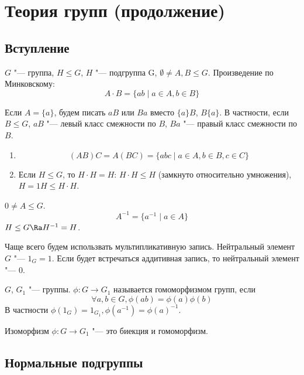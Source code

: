 ﻿\chapter{Теория групп (продолжение)}

\section{Вступление}

\begin{Def}
	$G$ "--- группа, $H \le G$, $H$ "--- подгруппа G, $\emptyset \ne A, B \le G$.
	Произведение по Минковскому:
	\[ A \cdot B = \{ab \mid a \in A, b \in B\} \]

	Если $A = \{a\}$, будем писать $aB$ или $Ba$ вместо $\{a\}B$, $B\{a\}$.
	В частности, если $B \le G$,
	$aB$ "--- левый класс смежности по $B$,
	$Ba$ "--- правый класс смежности по $B$.
\end{Def}

\begin{conseq}\hfill
	\begin{enumerate}
	\item
		\[ (AB)C = A(BC) = \{abc \mid a \in A, b \in B, c \in C\} \]

	\item
		Если $H \le G$, то $H \cdot H = H$:
		$H \cdot H \le H$ (замкнуто относительно умножения), $H = 1H \le H \cdot H$.
	\end{enumerate}
\end{conseq}

\begin{Def}
	$0 \ne A \le G$.
	\[ A^{-1} = \{a^{-1} \mid a \in A\} \]
	$H \le G \Ra H^{-1} = H$.
\end{Def}

\begin{Rem}
	Чаще всего будем использвать мультипликативную запись.
	Нейтральный элемент $G$ "--- $1_{G} = 1$.
	Если будет встречаться аддитивная запись, то нейтральный элемент "--- $0$.
\end{Rem}

\begin{Def}
	$G$, $G_1$ "--- группы.
	$\phi \colon G \to G_1$ называется гомоморфизмом групп, если
	\[ \forall a, b \in G, \phi(ab) = \phi(a) \phi(b) \]
	В частности $\phi(1_G) = 1_{G_1}, \phi(a^{-1}) = \phi(a)^{-1}$.

	Изоморфизм $\phi\colon G \to G_1$ "--- это биекция и гомоморфизм.
\end{Def}

\section{Нормальные подгруппы}


